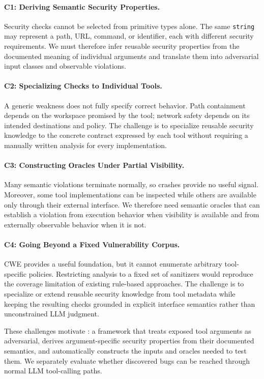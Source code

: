 \paragraph{C1: Deriving Semantic Security Properties.}
Security checks cannot be selected from primitive types alone. The same
\texttt{string} may represent a path, URL, command, or identifier, each with
different security requirements. We must therefore infer reusable security
properties from the documented meaning of individual arguments and translate
them into adversarial input classes and observable violations.

\paragraph{C2: Specializing Checks to Individual Tools.}
A generic weakness does not fully specify correct behavior. Path containment
depends on the workspace promised by the tool; network safety depends on its
intended destinations and policy. The challenge is to specialize reusable
security knowledge to the concrete contract expressed by each tool without
requiring a manually written analysis for every implementation.

\paragraph{C3: Constructing Oracles Under Partial Visibility.}
Many semantic violations terminate normally, so crashes provide no useful
signal. Moreover, some tool implementations can be inspected while others are
available only through their external interface. We therefore need semantic
oracles that can establish a violation from execution behavior when visibility
is available and from externally observable behavior when it is not.

\paragraph{C4: Going Beyond a Fixed Vulnerability Corpus.}
CWE provides a useful foundation, but it cannot enumerate arbitrary
tool-specific policies. Restricting analysis to a fixed set of sanitizers
would reproduce the coverage limitation of existing rule-based approaches.
The challenge is to specialize or extend reusable security knowledge from tool
metadata while keeping the resulting checks grounded in explicit interface
semantics rather than unconstrained LLM judgment.

These challenges motivate \project{}: a framework that treats exposed tool
arguments as adversarial, derives argument-specific security properties from
their documented semantics, and automatically constructs the inputs and
oracles needed to test them. We separately evaluate whether discovered bugs
can be reached through normal LLM tool-calling paths.
